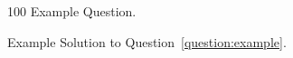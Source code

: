 \begin{question}{100}
  \label{question:example}
  Example Question.
\end{question}

\begin{solution}
  Example Solution to Question~\ref{question:example}.
\end{solution}
